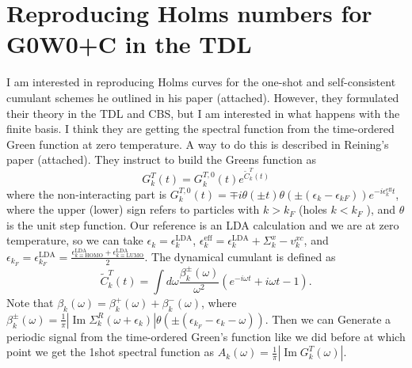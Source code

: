 \section{Reproducing Holms numbers for G0W0+C in the TDL}
I am interested in reproducing Holms curves for the one-shot and self-consistent cumulant schemes he outlined in his paper (attached). However, they formulated their theory in the TDL and CBS, but I am interested in what happens with the finite basis. I think they are getting the spectral function from the time-ordered Green function at zero temperature. A way to do this is described in Reining's paper (attached). They instruct to build the Greens function as 
\begin{equation}
G_k^T(t)=G_k^{T, 0}(t) e^{\tilde{C}_k^T(t)}
\end{equation}
where the non-interacting part is $G_k^{T, 0}(t)=\mp i \theta( \pm t) \theta\left( \pm\left(\epsilon_k-\epsilon_{k F}\right)\right) e^{-i \epsilon_k^{\text{eff}} t}$, where the upper (lower) sign refers to particles with $k>k_F$ (holes $k<k_F$ ), and $\theta$ is the unit step function. Our reference is an LDA calculation and we are at zero temperature, so we can take $\epsilon_k=\epsilon_k^{\text{LDA}}$, $\epsilon_k^{\text{eff}}=\epsilon_k^{\text{LDA}}+\Sigma_k^x - v_k^{xc}$, and $\epsilon_{k_F}=\epsilon_{k_F}^{\text{LDA}}=\frac{\epsilon_{k\equiv\text{HOMO}}^{\text{LDA}} + \epsilon_{k\equiv\text{LUMO}}^{\text{LDA}}}{2}$.
The dynamical cumulant is defined as 
\begin{equation}
    \tilde{C}_k^T(t)=\int d \omega \frac{\beta_k^{ \pm}(\omega)}{\omega^2}\left(e^{-i \omega t}+i \omega t-1\right) .
\end{equation}
Note that $\beta_k(\omega)=\beta_k^{+}(\omega)+\beta_k^{-}(\omega)$, where $\beta_k^{ \pm}(\omega)= \frac{1}{\pi}\left|\operatorname{Im} \Sigma_k^R\left(\omega+\epsilon_k\right)\right| \theta\left( \pm\left(\epsilon_{k_F}-\epsilon_k-\omega\right)\right)$. Then we can Generate a periodic signal from the time-ordered Green's function like we did before
at which point we get the 1shot spectral function as $A_k(\omega) = \frac{1}{\pi} |\operatorname{Im} G^T_k(\omega)|$.
